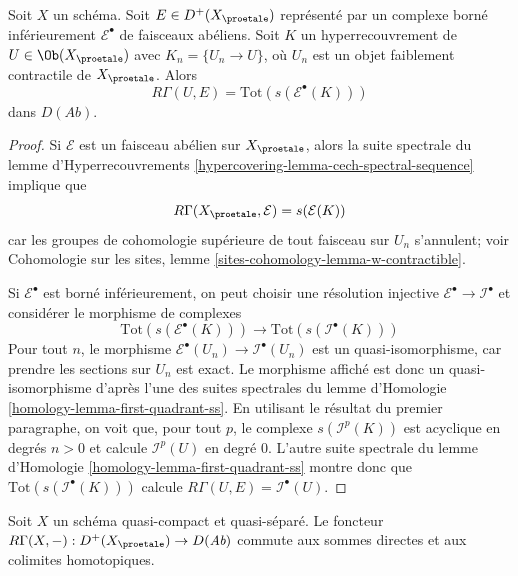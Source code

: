 \begin{lemma}
\label{lemma-compute-cohomology}
Soit $X$ un schéma. Soit $E \in D^+(X_\proetale)$ représenté par
un complexe borné inférieurement $\mathcal{E}^\bullet$ de faisceaux abéliens.
Soit $K$ un hyperrecouvrement de $U \in \Ob(X_\proetale)$ avec
$K_n = \{U_n \to U\}$, où $U_n$ est un objet faiblement contractile de
$X_\proetale$. Alors
$$
R\Gamma(U, E) = \text{Tot}(s(\mathcal{E}^\bullet(K)))
$$
dans $D(\textit{Ab})$.
\end{lemma}

\begin{proof}
Si $\mathcal{E}$ est un faisceau
abélien sur $X_\proetale$, alors la suite spectrale du
lemme d'Hyperrecouvrements \ref{hypercovering-lemma-cech-spectral-sequence}
implique que
$$
R\Gamma(X_\proetale, \mathcal{E}) = s(\mathcal{E}(K))
$$
car les groupes de cohomologie supérieure de tout faisceau sur $U_n$ s'annulent; voir
Cohomologie sur les sites, lemme \ref{sites-cohomology-lemma-w-contractible}.

\medskip\noindent
Si $\mathcal{E}^\bullet$ est borné inférieurement, on peut choisir une résolution
injective $\mathcal{E}^\bullet \to \mathcal{I}^\bullet$ et considérer
le morphisme de complexes
$$
\text{Tot}(s(\mathcal{E}^\bullet(K)))
\longrightarrow
\text{Tot}(s(\mathcal{I}^\bullet(K)))
$$
Pour tout $n$, le morphisme $\mathcal{E}^\bullet(U_n) \to \mathcal{I}^\bullet(U_n)$
est un quasi-isomorphisme, car prendre les sections sur $U_n$ est exact.
Le morphisme affiché est donc un quasi-isomorphisme d'après l'une des suites
spectrales du
lemme d'Homologie \ref{homology-lemma-first-quadrant-ss}.
En utilisant le résultat du premier paragraphe, on voit que, pour tout $p$,
le complexe $s(\mathcal{I}^p(K))$ est acyclique en degrés $n > 0$ et
calcule $\mathcal{I}^p(U)$ en degré $0$. L'autre suite
spectrale du
lemme d'Homologie \ref{homology-lemma-first-quadrant-ss}
montre donc que $\text{Tot}(s(\mathcal{I}^\bullet(K)))$ calcule
$R\Gamma(U, E) = \mathcal{I}^\bullet(U)$.
\end{proof}

\begin{lemma}
\label{lemma-quasi-compact-quasi-separated-commutes-direct-sums}
Soit $X$ un schéma quasi-compact et quasi-séparé.
Le foncteur $R\Gamma(X, -) : D^+(X_\proetale) \to D(\textit{Ab})$
commute aux sommes directes et aux colimites homotopiques.
\end{lemma}

